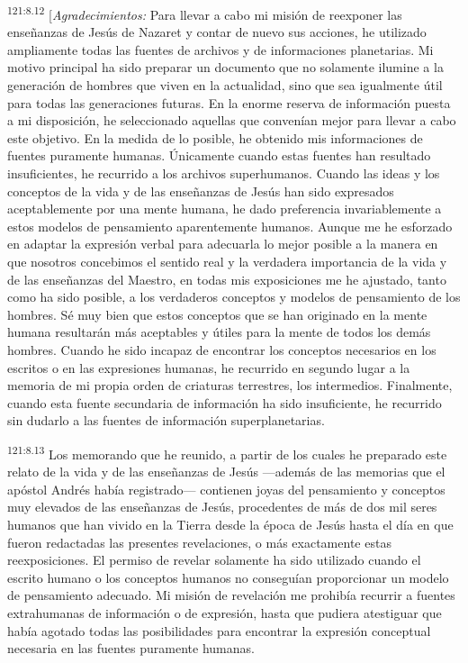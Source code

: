 \par 
\textsuperscript{121:8.12} [\textit{Agradecimientos:} Para llevar a cabo mi misión de reexponer las enseñanzas de Jesús de Nazaret y contar de nuevo sus acciones, he utilizado ampliamente todas las fuentes de archivos y de informaciones planetarias. Mi motivo principal ha sido preparar un documento que no solamente ilumine a la generación de hombres que viven en la actualidad, sino que sea igualmente útil para todas las generaciones futuras. En la enorme reserva de información puesta a mi disposición, he seleccionado aquellas que convenían mejor para llevar a cabo este objetivo. En la medida de lo posible, he obtenido mis informaciones de fuentes puramente humanas. Únicamente cuando estas fuentes han resultado insuficientes, he recurrido a los archivos superhumanos. Cuando las ideas y los conceptos de la vida y de las enseñanzas de Jesús han sido expresados aceptablemente por una mente humana, he dado preferencia invariablemente a estos modelos de pensamiento aparentemente humanos. Aunque me he esforzado en adaptar la expresión verbal para adecuarla lo mejor posible a la manera en que nosotros concebimos el sentido real y la verdadera importancia de la vida y de las enseñanzas del Maestro, en todas mis exposiciones me he ajustado, tanto como ha sido posible, a los verdaderos conceptos y modelos de pensamiento de los hombres. Sé muy bien que estos conceptos que se han originado en la mente humana resultarán más aceptables y útiles para la mente de todos los demás hombres. Cuando he sido incapaz de encontrar los conceptos necesarios en los escritos o en las expresiones humanas, he recurrido en segundo lugar a la memoria de mi propia orden de criaturas terrestres, los intermedios. Finalmente, cuando esta fuente secundaria de información ha sido insuficiente, he recurrido sin dudarlo a las fuentes de información superplanetarias.

\par 
\textsuperscript{121:8.13} Los memorando que he reunido, a partir de los cuales he preparado este relato de la vida y de las enseñanzas de Jesús ---además de las memorias que el apóstol Andrés había registrado--- contienen joyas del pensamiento y conceptos muy elevados de las enseñanzas de Jesús, procedentes de más de dos mil seres humanos que han vivido en la Tierra desde la época de Jesús hasta el día en que fueron redactadas las presentes revelaciones, o más exactamente estas reexposiciones. El permiso de revelar solamente ha sido utilizado cuando el escrito humano o los conceptos humanos no conseguían proporcionar un modelo de pensamiento adecuado. Mi misión de revelación me prohibía recurrir a fuentes extrahumanas de información o de expresión, hasta que pudiera atestiguar que había agotado todas las posibilidades para encontrar la expresión conceptual necesaria en las fuentes puramente humanas.

